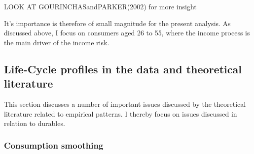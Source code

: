 \documentclass[a4paper,12pt,legno]{article}
\begin{document}
LOOK AT GOURINCHASandPARKER(2002) for more insight

It's importance is therefore of small magnitude for the present analysis. As discussed above, I focus on consumers aged 26 to 55, where the income process is the main driver of the income risk. 

\subsection{Life-Cycle profiles in the data and theoretical literature}

This section discusses a number of important issues discussed by the theoretical literature related to empirical patterns. I thereby focus on issues discussed in relation to durables. 

\subsubsection{Consumption smoothing}
\end{document}
